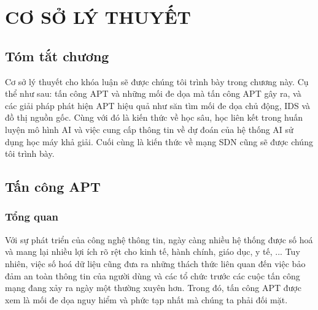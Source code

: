 
\chapter{CƠ SỞ LÝ THUYẾT} %

\label{Chapter2} %

\section*{Tóm tắt chương}

Cơ sở lý thuyết cho khóa luận sẽ được chúng tôi trình bày trong chương này. Cụ thể như sau: tấn công APT và những mối đe dọa mà tấn công APT gây ra, và các giải pháp phát hiện APT hiệu quả như săn tìm mối đe dọa chủ động, IDS và đồ thị nguồn gốc. Cùng với đó là kiến thức về học sâu, học liên kết trong huấn luyện mô hình AI và việc cung cấp thông tin về dự đoán của hệ thống AI sử dụng học máy khả giải. Cuối cùng là kiến thức về mạng SDN cũng sẽ được chúng tôi trình bày.


\section{Tấn công APT}

\subsection{Tổng quan}

Với sự phát triển của công nghệ thông tin, ngày càng nhiều hệ thống được số hoá và mang lại nhiều lợi ích rõ rệt cho kinh tế, hành chính, giáo dục, y tế, ... Tuy nhiên, việc số hoá dữ liệu cũng đưa ra những thách thức liên quan đến việc bảo đảm an toàn thông tin của người dùng và các tổ chức trước các cuộc tấn công mạng đang xảy ra ngày một thường xuyên hơn. Trong đó, tấn công APT được xem là mối đe dọa nguy hiểm và phức tạp nhất mà chúng ta phải đối mặt.

